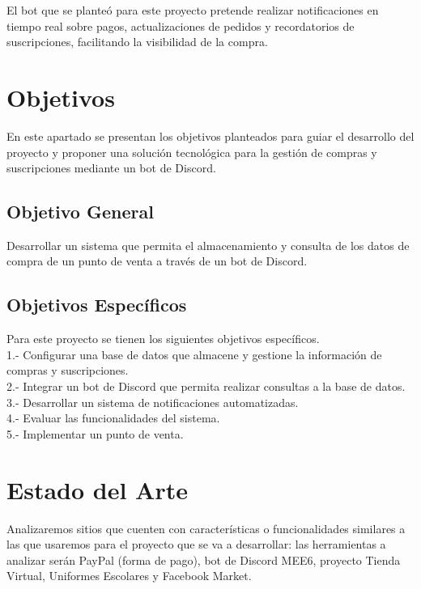 \documentclass[a4paper,12pt]{article}
\begin{document}
El bot que se planteó para este proyecto pretende realizar notificaciones en tiempo real sobre pagos, actualizaciones de pedidos y recordatorios de suscripciones, facilitando la visibilidad de la compra.

\newpage

\section{Objetivos}
En este apartado se presentan los objetivos planteados para guiar el desarrollo del proyecto y proponer una solución tecnológica para la gestión de compras y suscripciones mediante un bot de Discord.
\subsection{Objetivo General}
Desarrollar un sistema que permita el almacenamiento y consulta de los datos de compra de un punto de venta a través de un bot de Discord. \\

\subsection{Objetivos Específicos}
Para este proyecto se tienen los siguientes objetivos específicos. \\

1.- Configurar una base de datos que almacene y gestione la información de compras y suscripciones.\\

2.- Integrar un bot de Discord que permita realizar consultas a la base de datos.\\

3.- Desarrollar un sistema de notificaciones automatizadas.\\

4.- Evaluar las funcionalidades del sistema.\\

5.- Implementar un punto de venta.\\

\newpage

\section{Estado del Arte}
Analizaremos sitios que cuenten con características o funcionalidades similares a las que usaremos para el proyecto que se va a desarrollar: las herramientas a analizar serán PayPal (forma de pago), bot de Discord MEE6, proyecto Tienda Virtual, Uniformes Escolares y Facebook Market.\\
\end{document}
